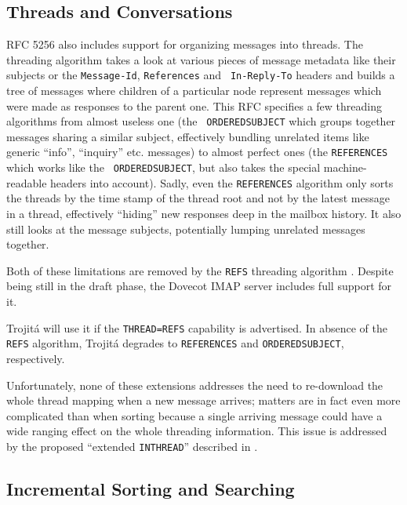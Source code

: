 \documentclass[trojita]{subfiles}
\begin{document}
\subsection{Threads and Conversations}

RFC 5256 \cite{rfc5256} also includes support for organizing messages into threads.  The threading algorithm takes a
look at various pieces of message metadata like their subjects or the {\tt Message-Id}, {\tt References} and {\tt
In-Reply-To} headers and builds a tree of messages where children of a particular node represent messages which were
made as responses to the parent one.  This RFC specifies a few threading algorithms from almost useless one (the {\tt
ORDEREDSUBJECT} which groups together messages sharing a similar subject, effectively bundling unrelated items like
generic ``info'', ``inquiry'' etc. messages) to almost perfect ones (the {\tt REFERENCES} which works like the {\tt
ORDEREDSUBJECT}, but also takes the special machine-readable headers into account).  Sadly, even the {\tt REFERENCES}
algorithm only sorts the threads by the time stamp of the thread root and not by the latest message in a thread,
effectively ``hiding'' new responses deep in the mailbox history.  It also still looks at the message subjects,
potentially lumping unrelated messages together.

Both of these limitations are removed by the {\tt REFS} threading algorithm \cite{draft-ietf-morg-inthread}.  Despite
being still in the draft phase, the Dovecot IMAP server includes full support for it.

\begin{trojitabehavior}
Trojitá will use it if the {\tt THREAD=REFS} capability is advertised.  In absence of the {\tt REFS} algorithm, Trojitá
degrades to {\tt REFERENCES} and {\tt ORDEREDSUBJECT}, respectively.
\end{trojitabehavior}

Unfortunately, none of these extensions addresses the need to re-download the whole thread mapping when a new message
arrives; matters are in fact even more complicated than when sorting because a single arriving message could have a wide
ranging effect on the whole threading information.  This issue is addressed by the proposed ``extended {\tt INTHREAD}''
described in .

\subsection{Incremental Sorting and Searching}
\end{document}
